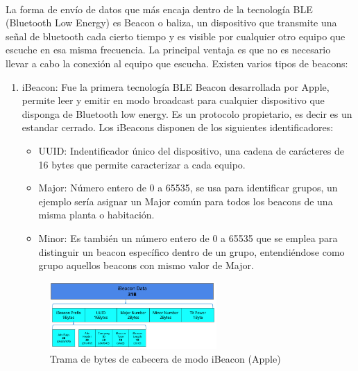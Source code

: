 \documentclass[paper=a4, fontsize=11pt,twoside]{scrartcl}	%
\begin{document}
            \paragraph{}
            La forma de envío de datos que más encaja dentro de la tecnología BLE (Bluetooth Low Energy) es Beacon o baliza, un 
            dispositivo que transmite una señal de bluetooth cada cierto tiempo y es visible por cualquier otro equipo que escuche 
            en esa misma frecuencia. La principal ventaja es que no es necesario llevar a cabo la conexión al equipo que escucha.
            Existen varios tipos de beacons:
            \begin{enumerate}
                \item iBeacon: Fue la primera tecnología BLE Beacon desarrollada por Apple, permite leer y emitir en modo 
                broadcast para cualquier dispositivo que disponga de Bluetooth low energy. Es un protocolo propietario, es 
                decir es un estandar cerrado. 
                Los iBeacons disponen de los siguientes identificadores:
                \begin{itemize}
                    \item UUID: Indentificador único del dispositivo, una cadena de carácteres de 16 bytes
                    que permite caracterizar a cada equipo.
                    \item Major: Número entero de 0 a 65535, se usa para identificar grupos, un ejemplo sería 
                    asignar un Major común para todos los beacons de una misma planta o habitación.
                    \item Minor: Es también un número entero de 0 a 65535 que se emplea para distinguir un beacon
                    específico dentro de un grupo, entendiéndose como grupo aquellos beacons con mismo valor de Major.
                \end{itemize}
                \begin{center}
                    \begin{figure}[ht]
                        \centering
                        \includegraphics[width=0.6\textwidth]{tipos_beacon_ibeacon.PNG}
                        \caption{Trama de bytes de cabecera de modo iBeacon (Apple)}

\end{figure}
\end{center}
\end{enumerate}
\end{document}

